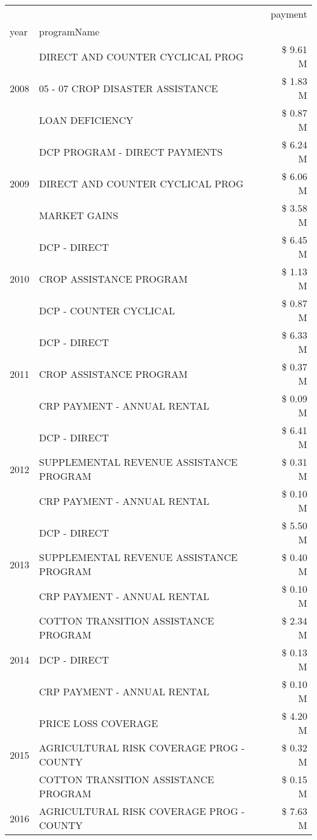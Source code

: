 \begin{tabular}{llr}
\toprule
 &  & payment \\
year & programName &  \\
\midrule
\multirow[t]{3}{*}{2008} & DIRECT AND COUNTER CYCLICAL PROG & \$ 9.61 M \\
 & 05 - 07 CROP DISASTER ASSISTANCE & \$ 1.83 M \\
 & LOAN DEFICIENCY & \$ 0.87 M \\
\cline{1-3}
\multirow[t]{3}{*}{2009} & DCP PROGRAM - DIRECT PAYMENTS & \$ 6.24 M \\
 & DIRECT AND COUNTER CYCLICAL PROG & \$ 6.06 M \\
 & MARKET GAINS & \$ 3.58 M \\
\cline{1-3}
\multirow[t]{3}{*}{2010} & DCP - DIRECT & \$ 6.45 M \\
 & CROP ASSISTANCE PROGRAM & \$ 1.13 M \\
 & DCP - COUNTER CYCLICAL & \$ 0.87 M \\
\cline{1-3}
\multirow[t]{3}{*}{2011} & DCP - DIRECT & \$ 6.33 M \\
 & CROP ASSISTANCE PROGRAM & \$ 0.37 M \\
 & CRP PAYMENT - ANNUAL RENTAL & \$ 0.09 M \\
\cline{1-3}
\multirow[t]{3}{*}{2012} & DCP - DIRECT & \$ 6.41 M \\
 & SUPPLEMENTAL REVENUE ASSISTANCE PROGRAM & \$ 0.31 M \\
 & CRP PAYMENT - ANNUAL RENTAL & \$ 0.10 M \\
\cline{1-3}
\multirow[t]{3}{*}{2013} & DCP - DIRECT & \$ 5.50 M \\
 & SUPPLEMENTAL REVENUE ASSISTANCE PROGRAM & \$ 0.40 M \\
 & CRP PAYMENT - ANNUAL RENTAL & \$ 0.10 M \\
\cline{1-3}
\multirow[t]{3}{*}{2014} & COTTON TRANSITION ASSISTANCE PROGRAM & \$ 2.34 M \\
 & DCP - DIRECT & \$ 0.13 M \\
 & CRP PAYMENT - ANNUAL RENTAL & \$ 0.10 M \\
\cline{1-3}
\multirow[t]{3}{*}{2015} & PRICE LOSS COVERAGE & \$ 4.20 M \\
 & AGRICULTURAL RISK COVERAGE PROG - COUNTY & \$ 0.32 M \\
 & COTTON TRANSITION ASSISTANCE PROGRAM & \$ 0.15 M \\
\cline{1-3}
\multirow[t]{3}{*}{2016} & AGRICULTURAL RISK COVERAGE PROG - COUNTY & \$ 7.63 M \\

\end{tabular}
